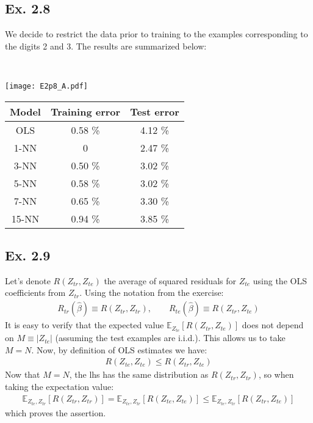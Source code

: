 \subsection*{Ex. 2.8 \seecode}
We decide to restrict the data prior to training to the examples corresponding to the digits 2 and 3. The results are summarized below:

\hspace{0.5cm}\\
\begin{minipage}{\half}
\texttt{[image: E2p8\_A.pdf]}
\end{minipage}\halfspace
\begin{minipage}{\half}
\centering
\begin{tabular}{|c|c|c|}
\hline
\textbf{Model} & \textbf{Training error} & \textbf{Test error}\\
\hline
OLS & 0.58 \% & 4.12 \% \\
\hline
1-NN & 0 & 2.47 \% \\
\hline
3-NN & 0.50 \% & 3.02 \% \\
\hline
5-NN & 0.58 \% & 3.02 \% \\
\hline
7-NN & 0.65 \% & 3.30 \% \\
\hline
15-NN & 0.94 \% & 3.85 \% \\
\hline
\end{tabular}
\end{minipage}



\subsection*{Ex. 2.9}
Let's denote $R(Z_{tr}, Z_{te})$ the average of squared residuals for $Z_{te}$ using the OLS coefficients from $Z_{tr}$. Using the notation from the exercise:
\begin{eqnarray*}
R_{tr}(\hat{\beta}) \equiv R(Z_{tr}, Z_{tr}), \qquad R_{te}(\hat{\beta}) \equiv R(Z_{tr}, Z_{te})
\end{eqnarray*}
It is easy to verify that the expected value $ \mathbb{E}_{Z_{te}} \left[ R(Z_{tr}, Z_{te}) \right]$ does not depend on $M \equiv |Z_{te}|$ (assuming the test examples are i.i.d.). This allows us to take $M = N$. Now, by definition of OLS estimates we have:
\begin{eqnarray*}
R(Z_{te}, Z_{te}) \leq R(Z_{tr}, Z_{te})
\end{eqnarray*}
Now that $M = N$, the lhs has the same distribution as $R(Z_{tr}, Z_{tr})$, so when taking the expectation value:
\begin{eqnarray*}
\mathbb{E}_{Z_{te}, Z_{tr}} \left[ R(Z_{tr}, Z_{tr}) \right] = \mathbb{E}_{Z_{te}, Z_{tr}} \left[ R(Z_{te}, Z_{te}) \right] \leq \mathbb{E}_{Z_{te}, Z_{tr}} \left[ R(Z_{tr}, Z_{te})  \right]
\end{eqnarray*}
which proves the assertion.
